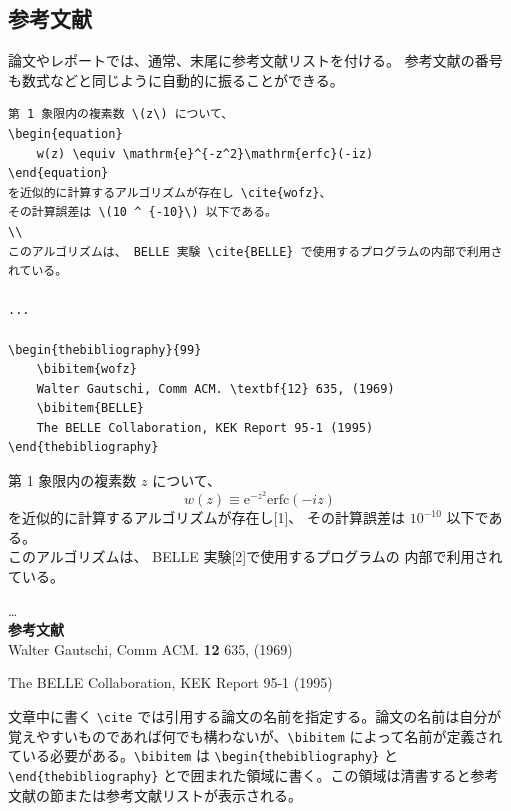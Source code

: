 \subsection{参考文献}
\label{sec:latex:bibliography}

論文やレポートでは、通常、末尾に参考文献リストを付ける。
参考文献の番号も数式などと同じように自動的に振ることができる。
\begin{reidai}
    \begin{verbatim}
第 1 象限内の複素数 \(z\) について、
\begin{equation}
    w(z) \equiv \mathrm{e}^{-z^2}\mathrm{erfc}(-iz)
\end{equation}
を近似的に計算するアルゴリズムが存在し \cite{wofz}、
その計算誤差は \(10 ^ {-10}\) 以下である。
\\
このアルゴリズムは、 BELLE 実験 \cite{BELLE} で使用するプログラムの内部で利用されている。

...

\begin{thebibliography}{99}
    \bibitem{wofz}
    Walter Gautschi, Comm ACM. \textbf{12} 635, (1969)
    \bibitem{BELLE}
    The BELLE Collaboration, KEK Report 95-1 (1995)
\end{thebibliography}
\end{verbatim}
\end{reidai}
\setcounter{equation}{0}
\vspace*{-1.5em}
\begin{kekka}
    \hspace*{0.3cm}第 1 象限内の複素数 \(z\) について、
    \begin{equation}
        w(z) \equiv \mathrm{e}^{-z^2}\mathrm{erfc}(-iz)
    \end{equation}
    を近似的に計算するアルゴリズムが存在し[1]、
    その計算誤差は \(10 ^ {-10}\) 以下である。
    \\
    このアルゴリズムは、 BELLE 実験[2]で使用するプログラムの
    内部で利用されている。

    \dots \\[.2em]

    \noindent \textbf{\Large 参考文献} \\[.2em]

    \noindent [1] Walter Gautschi, Comm ACM. \textbf{12} 635, (1969)

    \noindent [2] The BELLE Collaboration, KEK Report 95-1 (1995)
\end{kekka} \noindent
文章中に書く \verb|\cite| では引用する論文の名前を指定する。論文の名前は自分が覚えやすいものであれば何でも構わないが、\verb|\bibitem| によって名前が定義されている必要がある。\verb|\bibitem| は \verb|\begin{thebibliography}| と \verb|\end{thebibliography}| とで囲まれた領域に書く。この領域は清書すると参考文献の節または参考文献リストが表示される。
